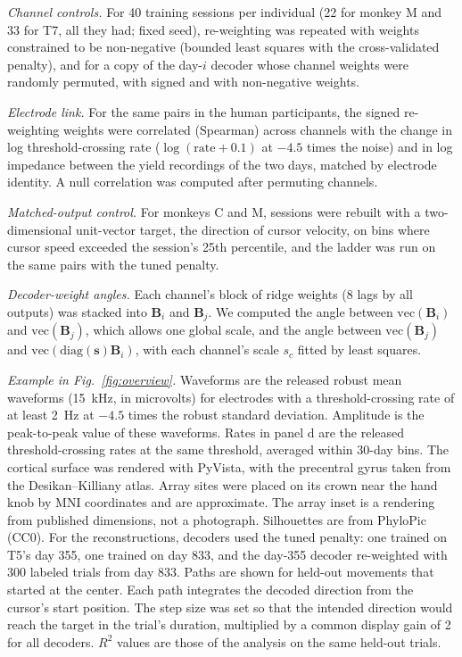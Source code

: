 \documentclass{iopjournal}
\begin{document}
\textit{Channel controls.} For 40 training sessions per individual (22 for monkey M and 33 for T7, all they had; fixed
seed), re-weighting was repeated with weights
constrained to be non-negative (bounded least squares with the cross-validated penalty), and for a copy of the day-$i$
decoder whose channel weights were randomly permuted, with signed and with non-negative weights.

\textit{Electrode link.} For the same pairs in the human participants, the signed re-weighting weights were correlated
(Spearman) across channels with the change in log threshold-crossing rate ($\log(\text{rate} + 0.1)$ at $-4.5$ times the
noise) and in log impedance between the yield recordings of the two days, matched by electrode identity. A null
correlation was computed after permuting channels.

\textit{Matched-output control.} For monkeys C and M, sessions were rebuilt with a two-dimensional unit-vector target,
the direction of cursor velocity, on bins where cursor speed exceeded the session's 25th percentile, and the ladder was run on
the same pairs with the tuned penalty.

\textit{Decoder-weight angles.} Each channel's block of ridge weights (8 lags by all outputs) was stacked into
$\mathbf{B}_i$ and $\mathbf{B}_j$. We computed the angle between $\mathrm{vec}(\mathbf{B}_i)$ and $\mathrm{vec}(\mathbf{B}_j)$,
which allows one global scale, and the angle between $\mathrm{vec}(\mathbf{B}_j)$ and $\mathrm{vec}(\mathrm{diag}(\mathbf{s})
\mathbf{B}_i)$, with each channel's scale $s_c$ fitted by least squares.

\textit{Example in Fig.~\ref{fig:overview}.} Waveforms are the released robust mean waveforms (15~kHz, in microvolts)
for electrodes with a threshold-crossing rate of at least 2~Hz at $-4.5$ times the robust standard deviation. Amplitude is the
peak-to-peak value of these waveforms. Rates in panel d are the released threshold-crossing rates at the same
threshold, averaged within 30-day bins. The cortical surface was rendered with PyVista, with the precentral gyrus taken from the Desikan--Killiany
atlas. Array sites were placed on its crown near the hand knob by MNI coordinates and are approximate. The array
inset is a rendering from published dimensions, not a photograph. Silhouettes are from PhyloPic (CC0). For the
reconstructions, decoders used the tuned penalty: one trained on T5's day 355, one trained on day 833, and the day-355
decoder re-weighted with 300 labeled trials from day 833. Paths are shown for held-out movements that started at the
center. Each path integrates the decoded direction from the cursor's start position. The step size was set so that
the intended direction would reach the target in the trial's duration, multiplied by a common display gain of 2 for
all decoders. $R^2$ values are those of the analysis on the same held-out trials.
\end{document}
